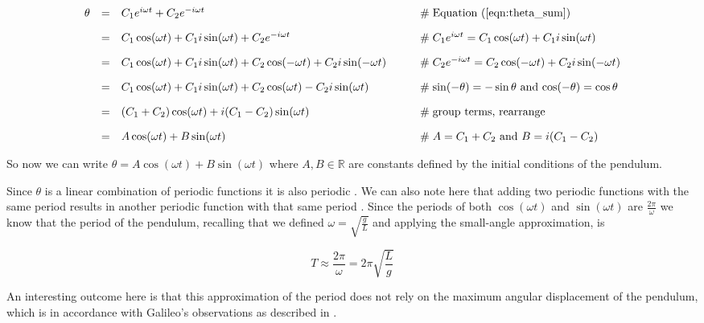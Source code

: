 \documentclass{article}
\theoremstyle{definition}
\begin{document}
\begin{equation*}
\begin{array}{llll}
\theta 
&=& C_1 e^{i\omega t} + C_2 e^{-i\omega t}
		&\qquad \mathrel{\#} \text{Equation (\ref{eqn:theta_sum})}	\\	
[10pt]
&=& C_1 \cos ( \omega t) + C_1 i \sin (\omega t) + C_2 e^{-i \omega t}	
		&\qquad \mathrel{\#} C_1 e^{i \omega t} = C_1 \cos (\omega t) + C_1 i \sin (\omega t) \\
[10pt]	
&=& C_1 \cos ( \omega t) + C_1 i \sin ( \omega t) + C_2 \cos (- \omega t) + C_2 i \sin(- \omega t)	
		&\qquad \mathrel{\#} C_2 e^{-i \omega t} = C_2 \cos (- \omega t) + C_2 i \sin(- \omega t) \\
[10pt]
&=& C_1 \cos ( \omega t) + C_1 i \sin ( \omega t) + C_2 \cos ( \omega t) - C_2 i \sin( \omega t)	
		&\qquad \mathrel{\#} \text{$\sin (- \theta) = - \sin \theta$ and $\cos (- \theta) = \cos \theta$} \\
[10pt]
&=& (C_1 + C_2) \cos ( \omega t) + i (C_1 - C_2) \sin ( \omega t)	
		&\qquad \mathrel{\#} \text{group terms, rearrange} \\
[10pt]
&=& A \cos ( \omega t) + B \sin ( \omega t)	
		&\qquad \mathrel{\#} \text{$A = C_1 + C_2$ and $B = i (C_1 - C_2)$}
\end{array}
\end{equation*}

\bigskip
\noindent
So now we can write $\theta = A \cos ( \omega t) + B \sin ( \omega t)$
where $A, B \in \mathbb{R}$ are constants defined by the initial
conditions of the pendulum. 

\bigskip
\noindent
Since $\theta$ is a linear
combination of periodic functions it is also periodic
\cite{periodic_functions}. We can also note here that adding two
periodic functions with the same period results in another
periodic function with that same period
\cite{periodic_functions}. Since the periods of both $\cos (
\omega t)$ and $\sin ( \omega t)$ are $\frac{2 \pi}{\omega}$ we
know that the period of the pendulum, recalling that we
defined $\omega = \sqrt{\frac{g}{L}}$ and applying the
small-angle approximation, is

\bigskip
\begin{equation*}
T \approx \dfrac{2 \pi}{\omega} = 2 \pi \sqrt{\dfrac{L}{g}}
\end{equation*}

\bigskip
\noindent
An interesting outcome here is that this approximation of the
period does not rely on the maximum angular displacement of the
pendulum, which is in accordance with Galileo’s observations as
described in \cite{helden1995}.
\end{document}
